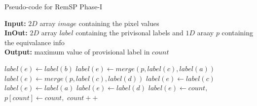 \begin{algorithm*}[ht]
\small
{
	\caption{Pseudo-code for RemSP Phase-I}
	\label{alg:RemSP-I}
	\textbf{Input:} $2D$ array $image$ containing the pixel values \\
	\textbf{InOut:} $2D$ array $label$ containing the privisonal labels and $1D$ araay $p$ containing the equivalance info\\
	\textbf{Output:} maximum value of provisional label in $count$
	\begin{algorithmic}[1]
						\State $label(e) \gets label(b)$
					\Else
								\State $label(e) \gets merge(p,label(c),label(a))$
							\Else
									\State $label(e) \gets merge(p,label(c),label(d))$
								\Else
									\State $label(e) \gets label(c)$
								\EndIf
							\EndIf
						\Else
								\State $label(e) \gets label(a)$
							\Else
									\State $label(e) \gets label(d)$
								\Else
									\State $label(e) \gets count,$
									\State $p[count] \gets count,$
									\State $count++$
								\EndIf
							\EndIf
						\EndIf
					\EndIf
				\EndIf
			\EndFor
		\EndFor
		\State {}
	\EndFunction
	\end{algorithmic}
}	
\end{algorithm*}

